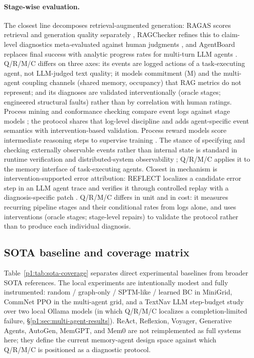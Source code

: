 \documentclass{article}
\begin{document}
\paragraph{Stage-wise evaluation.} The closest line decomposes retrieval-augmented generation: RAGAS scores retrieval and generation quality separately \citep{es2024ragas}, RAGChecker refines this to claim-level diagnostics meta-evaluated against human judgments \citep{ru2024ragchecker}, and AgentBoard replaces final success with analytic progress rates for multi-turn LLM agents \citep{ma2024agentboard}. Q/R/M/C differs on three axes: its events are logged actions of a task-executing agent, not LLM-judged text quality; it models commitment (M) and the multi-agent coupling channels (shared memory, occupancy) that RAG metrics do not represent; and its diagnoses are validated interventionally (oracle stages; engineered structural faults) rather than by correlation with human ratings. Process mining and conformance checking compare event logs against stage models \citep{vanderaalst2016process,carmona2018conformance}; the protocol shares that log-level discipline and adds agent-specific event semantics with intervention-based validation. Process reward models score intermediate reasoning steps to supervise training \citep{lightman2024verify}. The stance of specifying and checking externally observable events rather than internal state is standard in runtime verification and distributed-system observability \citep{leucker2009runtime}; Q/R/M/C applies it to the memory interface of task-executing agents. Closest in mechanism is intervention-supported error attribution: REFLECT localizes a candidate error step in an LLM agent trace and verifies it through controlled replay with a diagnosis-specific patch \citep{lin2026reflect}. Q/R/M/C differs in unit and in cost: it measures recurring pipeline stages and their conditional rates from logs alone, and uses interventions (oracle stages; stage-level repairs) to validate the protocol rather than to produce each individual diagnosis.

\subsection{SOTA baseline and coverage matrix}
\label{p1:app:sota-coverage}

Table~\ref{p1:tab:sota-coverage} separates direct experimental baselines from broader SOTA references. The local experiments are intentionally modest and fully instrumented: random / graph-only / SPTM-like / learned BC in MiniGrid, CommNet PPO in the multi-agent grid, and a TextNav LLM step-budget study over two local Ollama models (in which Q/R/M/C localizes a completion-limited failure, \S\ref{p1:sec:multi-agent-results}). ReAct, Reflexion, Voyager, Generative Agents, AutoGen, MemGPT, and Mem0 are not reimplemented as full systems here; they define the current memory-agent design space against which Q/R/M/C is positioned as a diagnostic protocol.
\end{document}
